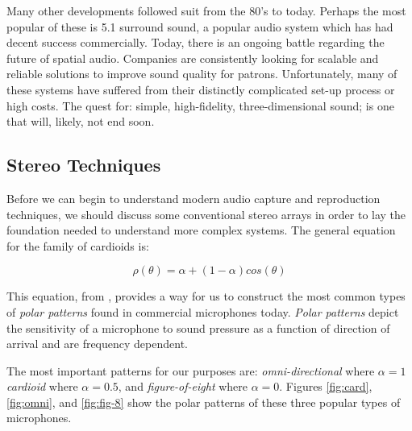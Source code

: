 Many other developments followed suit from the 80's to today. Perhaps the most popular of these is 5.1 surround sound, a popular audio system which has had decent success commercially. Today, there is an ongoing battle regarding the future of spatial audio. Companies are consistently looking for scalable and reliable solutions to improve sound quality for patrons. Unfortunately, many of these systems have suffered from their distinctly complicated set-up process or high costs. The quest for: simple, high-fidelity, three-dimensional sound; is one that will, likely, not end soon. 

\subsection{Stereo Techniques}

Before we can begin to understand modern audio capture and reproduction techniques, we should discuss some conventional stereo arrays in order to lay the foundation needed to understand more complex systems. The general equation for the family of cardioids is:

\begin{equation}
    \rho(\theta) = \alpha + (1-\alpha)cos(\theta)
\end{equation}

This equation, from \cite{ortolani2015introduction}, provides a way for us to construct the most common types of \textit{polar patterns} found in commercial microphones today. \textit{Polar patterns} depict the sensitivity of a microphone to sound pressure as a function of direction of arrival and are frequency dependent. 

The most important patterns for our purposes are: \textit{omni-directional} where $\alpha=1$ \textit{cardioid} where $\alpha = 0.5$, and \textit{figure-of-eight} where $\alpha=0$. Figures \ref{fig:card}, \ref{fig:omni}, and \ref{fig:fig-8} show the polar patterns of these three popular types of microphones.

